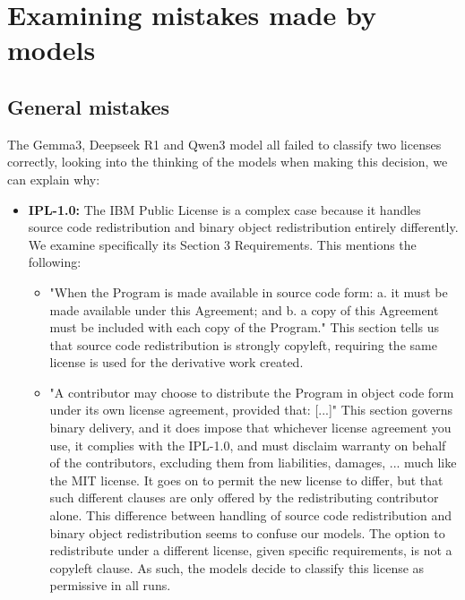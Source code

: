 \section{Examining mistakes made by models}

\subsection{General mistakes}

The Gemma3, Deepseek R1 and Qwen3 model all failed to classify two licenses correctly, looking into the thinking of the models when making this decision, we can explain why:
\begin{itemize}
	\item \textbf{IPL-1.0:} The IBM Public License is a complex case because it handles source code redistribution and binary object redistribution entirely differently. We examine specifically its Section 3 Requirements. This mentions the following:
	\begin{itemize}
		\item "When the Program is made available in source code form: a. it must be made available under this Agreement; and b. a copy of this Agreement must be included with each copy of the Program." This section tells us that source code redistribution is strongly copyleft, requiring the same license is used for the derivative work created.
		\item "A contributor may choose to distribute the Program in object code form under its own license agreement, provided that: [...]" This section governs binary delivery, and it does impose that whichever license agreement you use, it complies with the IPL-1.0, and must disclaim warranty on behalf of the contributors, excluding them from liabilities, damages, ... much like the MIT license. It goes on to permit the new license to differ, but that such different clauses are only offered by the redistributing contributor alone.
		This difference between handling of source code redistribution and binary object redistribution seems to confuse our models. The option to redistribute under a different license, given specific requirements, is not a copyleft clause. As such, the models decide to classify this license as permissive in all runs.
	\end{itemize}
	

\end{itemize}
